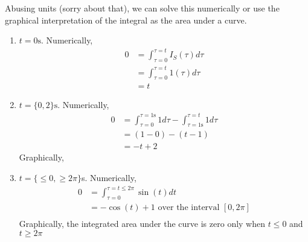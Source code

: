 \begin{enumerate}
{	Abusing units (sorry about that), we can solve this numerically or use the graphical interpretation of the integral as the area under a curve.
	\begin{enumerate}
		\item $t = 0\si{\second}$. Numerically,
		\begin{align*}
			0 &= \int_{\tau=0}^{\tau=t}I_S(\tau)d\tau\\
				&= \int_{\tau=0}^{\tau=t}1(\tau)d\tau\\
				&= t
		\end{align*}
		\item $t = \{0, 2\}\si{\second}$. Numerically,
		\begin{align*}
			0 &= \int_{\tau=0}^{\tau=1\si{\second}}1d\tau - \int_{\tau=1\si{\second}}^{\tau=t}1d\tau\\
				&= (1-0) - (t-1)\\
				&= -t + 2
		\end{align*}
		Graphically, 
		\begin{center}
			
		\end{center}
		\item $t = \{\leq 0, \geq 2\pi\} $\si{\second}. Numerically,
		\begin{align*}
			0 &= \int_{\tau=0}^{\tau=t\leq 2\pi}\sin(t)dt\\
				&= -\cos(t) + 1 \text{ over the interval }[0,2\pi]\\
		\end{align*}
		Graphically, the integrated area under the curve is zero only when $t\leq 0$ and $t \geq 2\pi$
		\begin{center}
			
		\end{center}
	\end{enumerate}

}
\end{enumerate}
